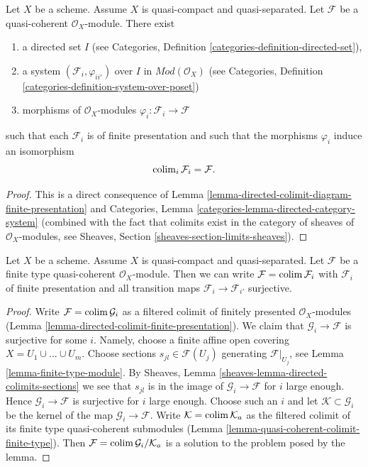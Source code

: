 \begin{lemma}
\label{lemma-directed-colimit-finite-presentation}
Let $X$ be a scheme. Assume $X$ is quasi-compact and quasi-separated.
Let $\mathcal{F}$ be a quasi-coherent $\mathcal{O}_X$-module.
There exist
\begin{enumerate}
\item a directed set $I$ (see
Categories, Definition \ref{categories-definition-directed-set}),
\item a system $(\mathcal{F}_i, \varphi_{ii'})$
over $I$ in $\textit{Mod}(\mathcal{O}_X)$ (see
Categories, Definition \ref{categories-definition-system-over-poset})
\item morphisms of $\mathcal{O}_X$-modules
$\varphi_i : \mathcal{F}_i \to \mathcal{F}$
\end{enumerate}
such that each $\mathcal{F}_i$ is of finite presentation
and such that the morphisms $\varphi_i$ induce an isomorphism
$$
\mathop{\mathrm{colim}}\nolimits_i \mathcal{F}_i
=
\mathcal{F}.
$$
\end{lemma}

\begin{proof}
This is a direct consequence of
Lemma \ref{lemma-directed-colimit-diagram-finite-presentation} and
Categories, Lemma \ref{categories-lemma-directed-category-system}
(combined with the fact that
colimits exist in the category of sheaves of $\mathcal{O}_X$-modules, see
Sheaves, Section \ref{sheaves-section-limits-sheaves}).
\end{proof}

\begin{lemma}
\label{lemma-finite-directed-colimit-surjective-maps}
Let $X$ be a scheme. Assume $X$ is quasi-compact and quasi-separated.
Let $\mathcal{F}$ be a finite type quasi-coherent $\mathcal{O}_X$-module.
Then we can write $\mathcal{F} = \mathop{\mathrm{colim}}\nolimits \mathcal{F}_i$ with $\mathcal{F}_i$
of finite presentation and all transition maps
$\mathcal{F}_i \to \mathcal{F}_{i'}$ surjective.
\end{lemma}

\begin{proof}
Write $\mathcal{F} = \mathop{\mathrm{colim}}\nolimits \mathcal{G}_i$ as a filtered colimit of
finitely presented $\mathcal{O}_X$-modules
(Lemma \ref{lemma-directed-colimit-finite-presentation}).
We claim that $\mathcal{G}_i \to \mathcal{F}$ is surjective for some $i$.
Namely, choose a finite affine open covering $X = U_1 \cup \ldots \cup U_m$.
Choose sections $s_{jl} \in \mathcal{F}(U_j)$ generating
$\mathcal{F}|_{U_j}$, see Lemma \ref{lemma-finite-type-module}.
By Sheaves, Lemma \ref{sheaves-lemma-directed-colimits-sections}
we see that $s_{jl}$ is in the image of $\mathcal{G}_i \to \mathcal{F}$
for $i$ large enough. Hence $\mathcal{G}_i \to \mathcal{F}$ is surjective
for $i$ large enough. Choose such an $i$ and let
$\mathcal{K} \subset \mathcal{G}_i$ be the kernel of the map
$\mathcal{G}_i \to \mathcal{F}$. Write $\mathcal{K} = \mathop{\mathrm{colim}}\nolimits \mathcal{K}_a$
as the filtered colimit of its finite type quasi-coherent submodules
(Lemma \ref{lemma-quasi-coherent-colimit-finite-type}). Then
$\mathcal{F} = \mathop{\mathrm{colim}}\nolimits \mathcal{G}_i/\mathcal{K}_a$ is a solution
to the problem posed by the lemma.
\end{proof}

